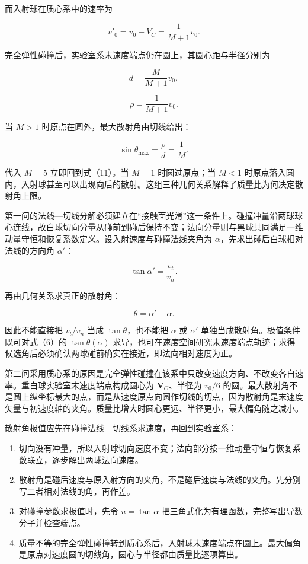 \documentclass[12pt,a4paper,UTF8]{ctexart}
\newcommand{\tightlist}{\setlength{\itemsep}{0pt}\setlength{\parskip}{0pt}}
\begin{document}
而入射球在质心系中的速率为

\[v'_0=v_0-V_C=\frac{1}{M+1}v_0.\]

完全弹性碰撞后，实验室系末速度端点仍在圆上，其圆心距与半径分别为

\[d=\frac{M}{M+1}v_0,\]

\[\rho=\frac{1}{M+1}v_0.\]

当 \(M>1\) 时原点在圆外，最大散射角由切线给出：

\[\sin\theta_{\max}=\frac{\rho}{d}=\frac1M.\]

代入 \(M=5\) 立即回到式（11）。当 \(M=1\) 时圆过原点；当 \(M<1\)
时原点落入圆内，入射球甚至可以出现向后的散射。这组三种几何关系解释了质量比为何决定散射角上限。

第一问的法线---切线分解必须建立在``接触面光滑''这一条件上。碰撞冲量沿两球球心连线，故白球切向分量从碰前到碰后保持不变；法向分量则与黑球共同满足一维动量守恒和恢复系数定义。设入射速度与碰撞法线夹角为
\(\alpha\)，先求出碰后白球相对法线的方向角 \(\alpha'\)：

\[\tan\alpha'=\frac{v_t}{v_n}.\]

再由几何关系求真正的散射角：

\[\theta=\alpha'-\alpha.\]

因此不能直接把 \(v_t/v_n\) 当成 \(\tan\theta\)，也不能把 \(\alpha\) 或
\(\alpha'\) 单独当成散射角。极值条件既可对式（6）的
\(\tan\theta(\alpha)\)
求导，也可在速度空间研究末速度端点轨迹；求得候选角后必须确认两球碰前确实在接近，即法向相对速度为正。

第二问采用质心系的原因是完全弹性碰撞在该系中只改变速度方向、不改变各自速率。重白球实验室末速度端点构成圆心为
\(\boldsymbol V_C\)、半径为 \(v_0/6\)
的圆。最大散射角不是圆上纵坐标最大的点，而是从速度原点向圆作切线的切点，因为散射角是末速度矢量与初速度轴的夹角。质量比增大时圆心更远、半径更小，最大偏角随之减小。

散射角极值应先在碰撞法线---切线系求速度，再回到实验室系：

\begin{enumerate}
\def\labelenumi{\arabic{enumi}.}
\tightlist
\item
  切向没有冲量，所以入射球切向速度不变；法向部分按一维动量守恒与恢复系数联立，逐步解出两球法向速度。
\item
  散射角是碰后速度与原入射方向的夹角，不是碰后速度与法线的夹角。先分别写二者相对法线的角，再作差。
\item
  对碰撞参数求极值时，先令 \(u=\tan\alpha\)
  把三角式化为有理函数，完整写出导数分子并检查端点。
\item
  质量不等的完全弹性碰撞转到质心系后，入射球末速度端点在圆上。最大偏角是原点对速度圆的切线角，圆心与半径都由质量比逐项算出。
\end{enumerate}
\end{document}
